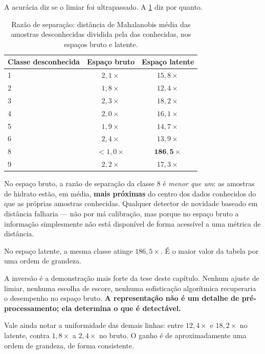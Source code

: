 A acurácia diz se o limiar foi ultrapassado. A \cref{tab:mahal-separacao} diz por quanto.

\begin{table}[htbp]
\centering
\caption{Razão de separação: distância de Mahalanobis média das amostras desconhecidas
dividida pela das conhecidas, nos espaços bruto e latente.}
\label{tab:mahal-separacao}
\small
\begin{tabular}{lcc}
\toprule
\textbf{Classe desconhecida} & \textbf{Espaço bruto} & \textbf{Espaço latente} \\
\midrule
1 & $2{,}1\times$ & $15{,}8\times$ \\
2 & $1{,}8\times$ & $12{,}4\times$ \\
3 & $2{,}3\times$ & $18{,}2\times$ \\
4 & $2{,}0\times$ & $16{,}1\times$ \\
5 & $1{,}9\times$ & $14{,}7\times$ \\
6 & $2{,}4\times$ & $13{,}9\times$ \\
8 & $<1{,}0\times$ & $\bm{186{,}5\times}$ \\
9 & $2{,}2\times$ & $17{,}3\times$ \\
\bottomrule
\end{tabular}
\end{table}

\begin{destaque}
No espaço bruto, a razão de separação da classe 8 é \emph{menor que um}: as amostras de
hidrato estão, em média, \textbf{mais próximas} do centro dos dados conhecidos do que as
próprias amostras conhecidas. Qualquer detector de novidade baseado em distância
falharia --- não por má calibração, mas porque no espaço bruto a informação simplesmente
não está disponível de forma acessível a uma métrica de distância.

No espaço latente, a mesma classe atinge $186{,}5\times$. É o maior valor da tabela por
uma ordem de grandeza.

A inversão é a demonstração mais forte da tese deste capítulo. Nenhum ajuste de limiar,
nenhuma escolha de escore, nenhuma sofisticação algorítmica recuperaria o desempenho no
espaço bruto. \textbf{A representação não é um detalhe de pré-processamento; ela
determina o que é detectável.}
\end{destaque}

Vale ainda notar a uniformidade das demais linhas: entre $12{,}4\times$ e $18{,}2\times$
no latente, contra $1{,}8\times$ a $2{,}4\times$ no bruto. O ganho é de aproximadamente
uma ordem de grandeza, de forma consistente.

